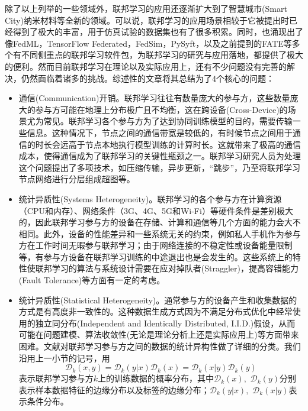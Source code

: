 除了以上列举的一些领域外，联邦学习的应用还逐渐扩大到了智慧城市(Smart City)\cite{Zheng_2021_fl_smart_city}纳米材料\cite{Huang_2022_fl_physics}等全新的领域。可以说，联邦学习的应用场景相较于它被提出时已经得到了极大的丰富，用于仿真试验的数据集也有了很多积累。同时，也涌现出了像FedML\cite{he_2020_fedml}，TensorFlow Federated\cite{tensorflow}，FedSim\cite{wu_2021_fedsim}，PySyft\cite{ryffel_2018_pysyft}，以及之前提到的FATE\cite{liu_2021_fate_fl}等多个有不同侧重点的联邦学习软件包，为联邦学习的研究与应用落地，都提供了极大的便利。然而目前联邦学习在理论以及实际应用上，还有不少问题没有完善的解决，仍然面临着诸多的挑战\cite{kairouz2019advances_fl, Li_2020_fl_challenges}。综述性的文章\parencite{Li_2020_fl_challenges}将其总结为了4个核心的问题：
\begin{itemize}
\item 通信(Communication)开销。联邦学习往往有数量庞大的参与方，这些数量庞大的参与方可能在地理上分布极广且不均衡，这在跨设备(Cross-Device)的场景尤为常见。联邦学习各个参与方为了达到协同训练模型的目的，需要传输一些信息。这种情况下，节点之间的通信带宽是较低的，有时候节点之间用于通信的时长会远高于节点本地执行模型训练的计算时长。这就带来了极高的通信成本，使得通信成为了联邦学习的关键性瓶颈之一。联邦学习研究人员为处理这个问题提出了多项技术，如压缩传输\cite{seide2014_1bitsgd}，异步更新\cite{tran2021feddr}，``跳步''\cite{proxskip, zhang2020fedpd}，乃至将联邦学习节点网络进行分层组成超图\cite{t2020pfedme}等。
\item 统计异质性(Systems Heterogeneity)。联邦学习的各个参与方在计算资源（CPU和内存）、网络条件（3G、4G、5G和Wi-Fi）等硬件条件是差别极大的，因此联邦学习参与方的设备在存储、计算和通信等几个方面的能力会大不相同。此外，设备的性能差异和一些系统无关的约束，例如私人手机作为参与方在工作时间无暇参与联邦学习；由于网络连接的不稳定性或设备能量限制等，有参与方设备在联邦学习训练的中途退出也是会发生的。这些系统上的特性使联邦学习的算法与系统设计需要在应对掉队者(Straggler)，提高容错能力(Fault Tolerance)等方面有一定的考虑。
\item 统计异质性(Statistical Heterogeneity)。通常参与方的设备产生和收集数据的方式是有高度非一致性的。这种数据生成方式因为不满足分布式优化中经常使用的独立同分布(Independent and Identically Distributed, I.I.D.)假设，从而可能在问题建模、算法收敛性(无论是理论分析上还是实际应用上)等方面带来困难。文献\cite{kairouz2019advances_fl}对联邦学习参与方之间的数据的统计异构性做了详细的分类。我们沿用上一小节的记号，用
\begin{equation}
\label{eq:dist_decomp}
\mathcal{D}_k(x, y) = \mathcal{D}_k(y | x) \mathcal{D}_k(x) = \mathcal{D}_k(x | y) \mathcal{D}_k(y)
\end{equation}
表示联邦学习参与方$k$上的训练数据的概率分布，其中$\mathcal{D}_k(x),$ $\mathcal{D}_k(y)$分别表示样本数据特征的边缘分布以及标签的边缘分布；$\mathcal{D}_k(y | x),$ $\mathcal{D}_k(x | y)$表示条件分布。


\end{itemize}
